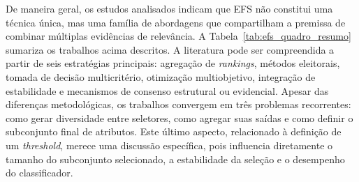 De maneira geral, os estudos analisados indicam que EFS não constitui uma técnica única, mas uma família de abordagens que compartilham a premissa de combinar múltiplas evidências de relevância. A Tabela~\ref{tab:efs_quadro_resumo} sumariza os trabalhos acima descritos. A literatura pode ser compreendida a partir de seis estratégias principais: agregação de \textit{rankings}, métodos eleitorais, tomada de decisão multicritério, otimização multiobjetivo, integração de estabilidade e mecanismos de consenso estrutural ou evidencial. Apesar das diferenças metodológicas, os trabalhos convergem em três problemas recorrentes: como gerar diversidade entre seletores, como agregar suas saídas e como definir o subconjunto final de atributos. Este último aspecto, relacionado à definição de um \textit{threshold}, merece uma discussão específica, pois influencia diretamente o tamanho do subconjunto selecionado, a estabilidade da seleção e o desempenho do classificador.


\footnotesize
\setlength{\LTleft}{0pt}
\setlength{\LTright}{0pt}
\setlength{\tabcolsep}{3.5pt}
\renewcommand{\arraystretch}{1.15}

